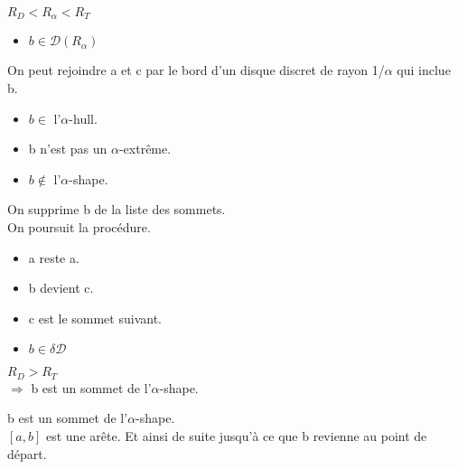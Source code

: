 \documentclass{beamer}
\begin{document}
\begin{frame}
\begin{columns}[t]
\begin{column}{3cm}
\begin{block}{}
{          \alert{$R_D < R_{\alpha} < R_T$}\\
        }
        {
          \begin{itemize}
            \item $b \in \mathcal{D} \left( R_{\alpha} \right)$
          \end{itemize}
          On peut rejoindre a et c par le bord d'un disque discret de rayon 1/$\alpha$ qui inclue b.
        }
        {
          \begin{itemize}
            \item $b \in$ l'$\alpha$-hull.
            \item b n'est pas un $\alpha$-extrême.
            \item $b \notin$ l'$\alpha$-shape.
          \end{itemize}
        }
        {
          On supprime b de la liste des sommets.\\
          On poursuit la procédure.\\
        }
        {
          \begin{itemize}
            \item a reste a.
            \item b devient c.
            \item c est le sommet suivant.
          \end{itemize}
        }
        {
          \begin{itemize}
            \item $b \in \delta \mathcal{D}$

          \end{itemize}
          $R_D > R_T$\\
          $\Rightarrow$ b est un sommet de l'$\alpha$-shape.\\
          
        }
        {
          b est un sommet de l'$\alpha$-shape.\\
          $[a, b]$ est une arête.
        }
        {
          Et ainsi de suite jusqu'à ce que b revienne au point de départ.\\
        }
      \end{block}
    \end{column}
  \end{columns}

\end{frame}
\end{document}
